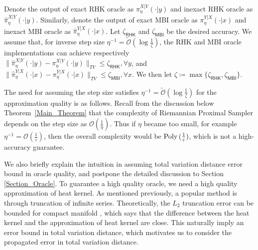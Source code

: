 \begin{assumption}\label{Assumption_Oracle_TV_quality}
    Denote the output of exact RHK oracle as $\pi_{\eta}^{X|Y}(\cdot|y)$ and inexact RHK oracle as $\hat{\pi}_{\eta}^{X|Y}(\cdot|y)$. Similarly, denote the output of exact MBI oracle as $\pi_{\eta}^{Y|X}(\cdot|x)$ and inexact MBI oracle as $\hat{\pi}_{\eta}^{Y|X}(\cdot|x)$. 
    Let $\zeta_{\mathsf{RHK}}$ and $\zeta_{\mathsf{MBI}}$ be the desired accuracy. We assume that, for inverse step size $\eta^{-1} = \tilde{\mathcal{O}}(\log \frac{1}{\zeta}) $, the RHK and MBI oracle implementations can achieve respectively $\|\hat{\pi}_{\eta}^{X|Y}(\cdot|y) - \pi_{\eta}^{X|Y}(\cdot|y)\|_{TV} \le \zeta_{\mathsf{RHK}}, \forall y$,
    and $\|\hat{\pi}_{\eta}^{Y|X}(\cdot|x) - \pi_{\eta}^{Y|X}(\cdot|x)\|_{TV} \le \zeta_{\mathsf{MBI}}, \forall x$. We then let $\zeta\coloneqq\max\{\zeta_{\mathsf{RHK}},\zeta_{\mathsf{MBI}} \}$.
\end{assumption}

The need for assuming the step size satisfies $\eta^{-1} = \tilde{\mathcal{O}}(\log \frac{1}{\zeta})$ for the approximation quality is as follows. Recall from the discussion below Theorem~\ref{Main_Theorem} that the complexity of Riemannian Proximal Sampler depends on the step size as $\mathcal{O}(\frac{1}{\eta})$. Thus if $\eta$ became too small, for example $\eta^{-1} = \mathcal{O}\left(\frac{1}{\varepsilon}\right)$, then the overall complexity would be $\operatorname{Poly\,}(\frac{1}{\varepsilon})$, which is not a high-accuracy guarantee.

We also briefly explain the intuition in assuming total variation distance error bound in oracle quality, 
and postpone the detailed discussion to Section \ref{Section_Oracle}.
To guarantee a high quality oracle, we need a high quality approximation of heat kernel. 
As mentioned previously, a popular method is through truncation of infinite series. 
Theoretically, the $L_{2}$ truncation error can be bounded for compact manifold \citep{azangulov2022stationary}, 
which says that the difference between the heat kernel and the approximation of heat kernel are close. 
This naturally imply an error bound in total variation distance, 
which motivates us to consider the propagated error in total variation distance. 

